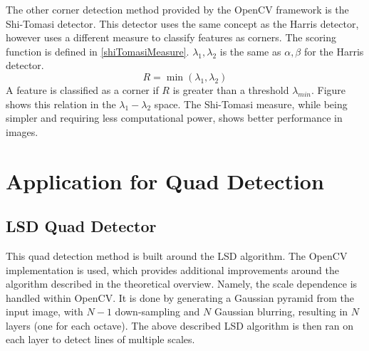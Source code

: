 The other corner detection method provided by the OpenCV framework is the Shi-Tomasi detector\cite{Shi94goodfeatures}.
This detector uses the same concept as the Harris detector, however uses a different measure to classify features as corners.
The scoring function is defined in \eqref{shiTomasiMeasure}. $\lambda_1, \lambda_2$ is the same as $\alpha, \beta$ for the Harris detector.
\begin{equation}
	R = \min(\lambda_1, \lambda_2)
	\label{eq:shiTomasiMeasure}
\end{equation}
A feature is classified as a corner if $R$ is greater than a threshold $\lambda_{min}$.
Figure  shows this relation in the $\lambda_1-\lambda_2$ space.
The Shi-Tomasi measure, while being simpler and requiring less computational power, shows better performance in images\cite{Shi94goodfeatures}.

\section{Application for Quad Detection}


\subsection{LSD Quad Detector}

This quad detection method is built around the LSD algorithm.
The OpenCV implementation is used, which provides additional improvements around the algorithm described in the theoretical overview.
Namely, the scale dependence is handled within OpenCV.
It is done by generating a Gaussian pyramid from the input image, with $N-1$ down-sampling and $N$ Gaussian blurring, resulting in $N$ layers (one for each octave).
The above described LSD algorithm is then ran on each layer to detect lines of multiple scales.

